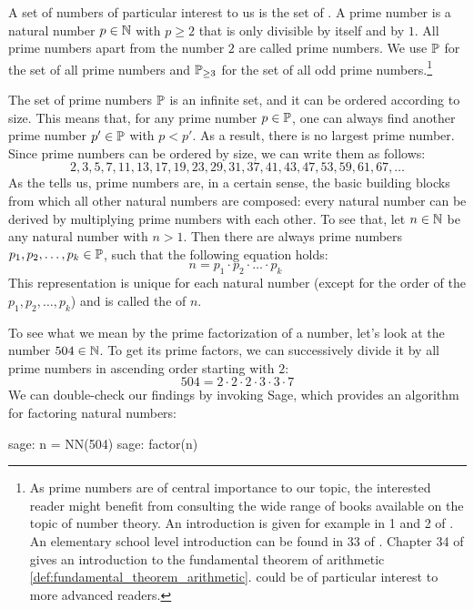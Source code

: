 A set of numbers of particular interest to us is the set of . A prime number is a natural number $ p \in \mathbb{N} $ with $ p \geq 2 $ that is only divisible by itself and by $1$. All prime numbers apart from the number $ 2 $ are called  prime numbers. We use $ \mathbb{P} $ for the set of all prime numbers and $ \mathbb{P} _{\geq 3} $ for the set of all odd prime numbers.\footnote{As prime numbers are of central importance to our topic, the interested reader might benefit from consulting the wide range of books available on the topic of number theory. An introduction is given for example in  \chaptname{} 1 and 2 of \cite{hardy-2008}. An elementary school level introduction can be found in  \chaptname{} 33 of \cite{wu-1}. Chapter 34 of \cite{wu-1} gives an introduction to the fundamental theorem of arithmetic \eqref{def:fundamental_theorem_arithmetic}. \cite{fine-2016} could be of particular interest to more advanced readers.}

The set of prime numbers $\mathbb{P}$ is an infinite set, and it can be ordered according to size. This means that, for any prime number $p\in\mathbb{P}$, one can always find another prime number $p'\in\mathbb{P}$ with $p<p'$. As a result, there is no largest prime number. Since prime numbers can be ordered by size, we can write them as follows:
\begin{equation}
\label{eq: primenumber_sequence}
2, 3, 5, 7, 11, 13, 17, 19, 23, 29, 31, 37, 41, 43, 47, 53, 59, 61, 67, \ldots
\end{equation}
As the  tells us, prime numbers are, in a certain sense, the basic building blocks from which all other natural numbers are composed: every natural number can be derived by multiplying prime numbers with each other. To see that, let $ n \in \mathbb{N} $ be any natural number with $n>1$. Then there are always prime numbers $ p_1, p_2, \ldots, p_k \in \mathbb{P} $, such that the following equation holds:
\begin{equation}
\label{def:fundamental_theorem_arithmetic}
n = p_1 \cdot p_2 \cdot \ldots \cdot p_k \;
\end{equation}
This representation is unique for each natural number (except for the order of the  $ p_1, p_2, \ldots, p_k$) and is called the  of $n$.

\begin{example}\label{ex-prime-factorization} To see what we mean by the prime factorization of a number, let's look at the number $504\in\mathbb{N}$. To get its prime factors, we can successively divide it by all prime numbers in ascending order starting with $2$:
\begin{equation*}
504 = 2\cdot 2\cdot 2\cdot 3\cdot 3\cdot 7
\end{equation*}
We can double-check our findings by invoking Sage, which provides an algorithm for factoring natural numbers:
\begin{sagecommandline}
sage: n = NN(504)
sage: factor(n)
\end{sagecommandline}
\end{example}

